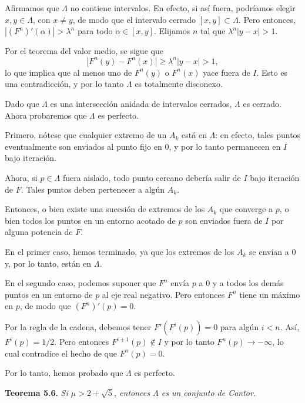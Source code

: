 \documentclass[10pt,a4paper]{book}
\begin{document}
Afirmamos que $\Lambda$ no contiene intervalos. En efecto, si así fuera, podríamos elegir $x,y\in\Lambda$, con $x\neq y$, de modo que el intervalo cerrado $[x,y]\subset\Lambda$. Pero entonces, $|(F^{n})'(\alpha)|>\lambda^{n}$ para todo $\alpha\in[x,y]$. Elijamos $n$ tal que $\lambda^{n}|y-x|>1$.  

Por el teorema del valor medio, se sigue que 
\[
|F^{n}(y)-F^{n}(x)| \geq \lambda^{n}|y-x|>1,
\] 
lo que implica que al menos uno de $F^{n}(y)$ o $F^{n}(x)$ yace fuera de $I$. Esto es una contradicción, y por lo tanto $\Lambda$ es totalmente disconexo.

\bigskip

Dado que $\Lambda$ es una intersección anidada de intervalos cerrados, $\Lambda$ es cerrado.  
Ahora probaremos que $\Lambda$ es perfecto.  

Primero, nótese que cualquier extremo de un $A_{k}$ está en $\Lambda$: en efecto, tales puntos 
eventualmente son enviados al punto fijo en $0$, y por lo tanto permanecen en $I$ bajo iteración.  

Ahora, si $p\in\Lambda$ fuera aislado, todo punto cercano debería salir de $I$ bajo iteración de $F$.  
Tales puntos deben pertenecer a algún $A_{k}$.  

Entonces, o bien existe una sucesión de extremos de los $A_{k}$ que converge a $p$, 
o bien todos los puntos en un entorno acotado de $p$ son enviados fuera de $I$ por alguna potencia de $F$.  

En el primer caso, hemos terminado, ya que los extremos de los $A_{k}$ se envían a $0$ y, por lo tanto, están en $\Lambda$.  

En el segundo caso, podemos suponer que $F^{n}$ envía $p$ a $0$ y a todos los demás puntos en un entorno de $p$ 
al eje real negativo.  
Pero entonces $F^{n}$ tiene un máximo en $p$, de modo que $(F^{n})'(p)=0$.  

Por la regla de la cadena, debemos tener $F'(F^{i}(p))=0$ para algún $i<n$.  
Así, $F^{i}(p)=1/2$.  
Pero entonces $F^{i+1}(p)\notin I$ y por lo tanto $F^{n}(p)\to -\infty$, lo cual contradice el hecho de que $F^{n}(p)=0$.  

\medskip

Por lo tanto, hemos probado que $\Lambda$ es perfecto.

\bigskip

\textbf{Teorema 5.6.} \textit{Si $\mu > 2 + \sqrt{5}$, entonces $\Lambda$ es un conjunto de Cantor.}

\medskip
\end{document}
